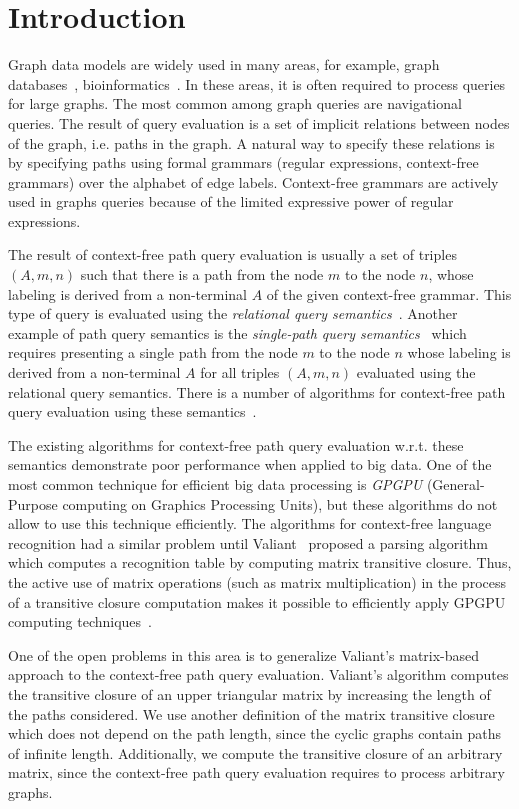 \section{Introduction}
Graph data models are widely used in many areas, for example, graph databases~\cite{graphDB}, bioinformatics~\cite{Bio}. In these areas, it is often required to process queries for large graphs. The most common among graph queries are navigational queries. The result of query evaluation is a set of implicit relations between nodes of the graph, i.e. paths in the graph. A natural way to specify these relations is by specifying paths using formal grammars (regular expressions, context-free grammars) over the alphabet of edge labels. Context-free grammars are actively used in graphs queries because of the limited expressive power of regular expressions. 

The result of context-free path query evaluation is usually a set of triples $(A, m, n)$ such that there is a path from the node $m$ to the node $n$, whose labeling is derived from a non-terminal $A$ of the given context-free grammar. This type of query is evaluated using the \textit{relational query semantics}~\cite{hellingsRelational}. Another example of path query semantics is the \textit{single-path query semantics}~\cite{hellingsPathQuerying} which requires presenting a single path from the node $m$ to the node $n$ whose labeling is derived from a non-terminal $A$ for all triples $(A, m, n)$ evaluated using the relational query semantics. There is a number of algorithms for context-free path query evaluation using these semantics~\cite{GLL, hellingsRelational, RDF, GraphQueryWithEarley}.

The existing algorithms for context-free path query evaluation w.r.t. these semantics demonstrate poor performance when applied to big data. One of the most common technique for efficient big data processing is \textit{GPGPU} (General-Purpose computing on Graphics Processing Units), but these algorithms do not allow to use this technique efficiently. The algorithms for context-free language recognition had a similar problem until Valiant~\cite{valiant} proposed a parsing algorithm which computes a recognition table by computing matrix transitive closure. Thus, the active use of matrix operations (such as matrix multiplication) in the process of a transitive closure computation makes it possible to efficiently apply GPGPU computing techniques~\cite{matricesOnGPGPU}.

One of the open problems in this area is to generalize Valiant's matrix-based approach to the context-free path query evaluation. Valiant's algorithm computes the transitive closure of an upper triangular matrix by increasing the length of the paths considered. We use another definition of the matrix transitive closure which does not depend on the path length, since the cyclic graphs contain paths of infinite length. Additionally, we compute the transitive closure of an arbitrary matrix, since the context-free path query evaluation requires to process arbitrary graphs. 

